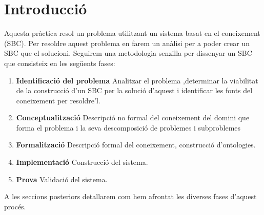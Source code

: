 \section{Introducció}
Aquesta pràctica resol un problema utilitzant un sistema basat en el coneixement (SBC). Per resoldre aquest problema en farem un anàlisi per a poder crear un SBC que el solucioni. Seguirem una metodologia senzilla per dissenyar un SBC que consisteix en les següents fases:

\begin{enumerate}

    \item \textbf{Identificació del problema} Analitzar el problema ,determinar la viabilitat de la construcció d'un SBC per la solució d'aquest i identificar les fonts del coneixement per resoldre'l.
    \item \textbf{Conceptualització} Descripció no formal del coneixement del domini que forma el problema i la seva descomposició de problemes i subproblemes
    \item \textbf{Formalització} Descripció formal del coneixement, construcció d'ontologies.
    \item \textbf{Implementació} Construcció del sistema.
    \item \textbf{Prova} Validació del sistema.
    
\end{enumerate}

A les seccions posteriors detallarem com hem afrontat les diverses fases d'aquest procés.